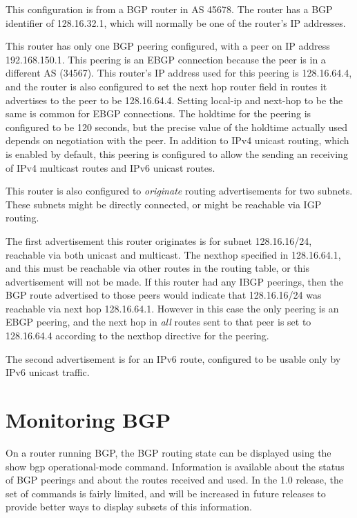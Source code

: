 \begin{description}
This configuration is from a BGP router in AS 45678.  The router has a
BGP identifier of 128.16.32.1, which will normally be one of the router's
IP addresses.

This router has only one BGP peering configured, with a peer on IP
address 192.168.150.1.  This peering is an EBGP connection because the
peer is in a different AS (34567).  This router's IP address used for
this peering is 128.16.64.4, and the router is also configured to set
the next hop router field in routes it advertises to the peer to be
128.16.64.4.  Setting local-ip and next-hop to be the same is common
for EBGP connections.  The holdtime for the peering is configured to
be 120 seconds, but the precise value of the holdtime actually used
depends on negotiation with the peer.  In addition to IPv4 unicast
routing, which is enabled by default, this peering is configured to
allow the sending an receiving of IPv4 multicast routes and IPv6
unicast routes.

This router is also configured to {\it originate} routing
advertisements for two subnets.  These subnets might be directly
connected, or might be reachable via IGP routing.

The first advertisement this router originates is for subnet
128.16.16/24, reachable via both unicast and multicast.  The nexthop
specified in 128.16.64.1, and this must be reachable via other routes
in the routing table, or this advertisement will not be made.  If this
router had any IBGP peerings, then the BGP route advertised to those
peers would indicate that 128.16.16/24 was reachable via next hop
128.16.64.1. However in this case the only peering is an EBGP peering,
and the next hop in {\it all} routes sent to that peer is set to
128.16.64.4 according to the {\stt nexthop} directive for the peering.

The second advertisement is for an IPv6 route, configured to be usable
only by IPv6 unicast traffic.

\newpage
\section{Monitoring BGP}

On a router running BGP, the BGP routing state can be displayed using
the {\stt show bgp} operational-mode command.  Information is available
about the status of BGP peerings and about the routes received and
used.  In the 1.0 release, the set of commands is fairly limited, and
will be increased in future releases to provide better ways to display
subsets of this information.


\end{description}
